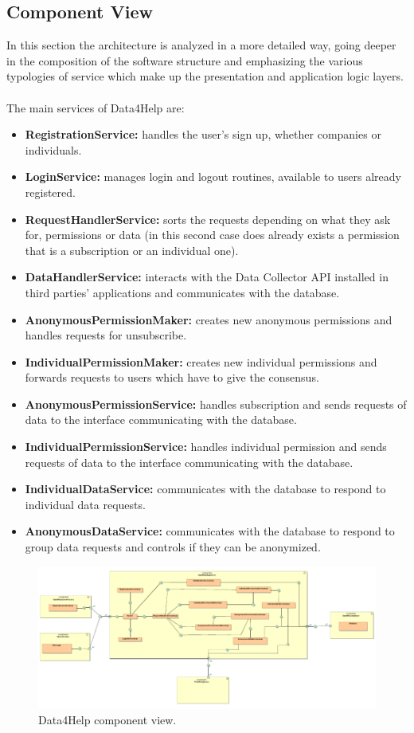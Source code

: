\documentclass[a4paper]{article}
\begin{document}
\subsection{Component View}
In this section the architecture is analyzed in a more detailed way, going deeper in the composition of the software structure and emphasizing the various typologies of service which make up the presentation and application logic layers.\\ \\
The main services of Data4Help are:
\begin{itemize}
    \item \textbf{RegistrationService:} handles the user's sign up, whether companies or individuals.
    \item \textbf{LoginService:} manages login and logout routines, available to users already registered.
    \item \textbf{RequestHandlerService:} sorts the requests depending on what they ask for, permissions or data (in this second case does already exists a permission that is a subscription or an individual one).
    \item \textbf{DataHandlerService:} interacts with the Data Collector API installed in third parties' applications and communicates with the database.
    \item \textbf{AnonymousPermissionMaker:} creates new anonymous permissions and handles requests for unsubscribe.
    \item \textbf{IndividualPermissionMaker:} creates new individual permissions and forwards requests to users which have to give the consensus.
    \item \textbf{AnonymousPermissionService:} handles subscription and sends requests of data to the interface communicating with the database.
    \item \textbf{IndividualPermissionService:}  handles individual permission and sends requests of data to the interface communicating with the database.
    \item \textbf{IndividualDataService:} communicates with the database to respond to individual data requests.
    \item \textbf{AnonymousDataService:} communicates with the database to respond to group data requests and controls if they can be anonymized.
\end{itemize}

\begin{figure}
    \centering
    \includegraphics[width=\linewidth]{ComponentData4Help}
    \caption{Data4Help component view.}
    \label{fig:my_label}
\end{figure}
\clearpage
\end{document}
